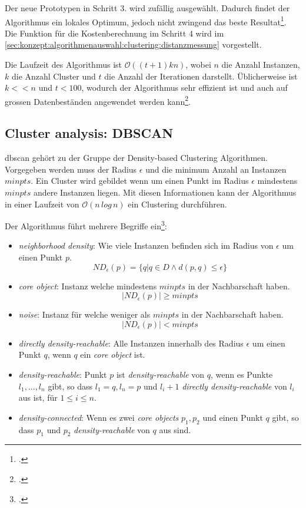Der neue Prototypen in Schritt 3. wird zufällig ausgewählt. Dadurch findet der Algorithmus ein lokales Optimum, jedoch nicht zwingend das beste Resultat\footcite{data_mining_concepts_and_techniques}.
Die Funktion für die Kostenberechnung im Schritt 4 wird im \cref{sec:konzept:algorithmenauswahl:clustering:distanzmessung} vorgestellt.

Die Laufzeit des Algorithmus ist $\mathcal{O}((t+1)kn)$, wobei $n$ die Anzahl Instanzen, $k$ die Anzahl Cluster und $t$ die Anzahl der Iterationen darstellt. Üblicherweise ist $k << n$ und $t < 100$, wodurch der Algorithmus sehr effizient ist und auch auf grossen Datenbeständen angewendet werden kann\footcite{clustering_numeric_and_categorical_values}.

\subsection{Cluster analysis: DBSCAN}
\label{sec:recherche:algorithmen:dbscan}
\gls{dbscan} gehört zu der Gruppe der Density-based Clustering Algorithmen. 
Vorgegeben werden muss der Radius $\epsilon$ und die minimum Anzahl an Instanzen $minpts$. Ein Cluster wird gebildet wenn um einen Punkt im Radius $\epsilon$ mindestens $minpts$ andere Instanzen liegen. Mit diesen Informationen kann der Algorithmus in einer Laufzeit von $\mathcal{O}(n\,log\,n)$ ein Clustering durchführen.

Der Algorithmus führt mehrere Begriffe ein\footcite{data_mining_concepts_and_techniques}:
\begin{itemize}
	\item \textit{neighborhood density}: Wie viele Instanzen befinden sich im Radius von $\epsilon$ um einen Punkt $p$. 
	\begin{equation}
	\mathit{ND}_{\epsilon}(p) = \{q | q \in D \wedge d(p,q) \leq \epsilon\}
	\end{equation}
	\item \textit{core object}: Instanz welche mindestens $minpts$ in der Nachbarschaft haben.
	\begin{equation}
	|\mathit{ND}_{\epsilon}(p)| \geq minpts
	\end{equation}
	\item \textit{noise}: Instanz für welche weniger als $minpts$ in der Nachbarschaft haben.
	\begin{equation}
	|\mathit{ND}_{\epsilon}(p)| < minpts
	\end{equation}
	\item \textit{directly density-reachable}: Alle Instanzen innerhalb des Radius $\epsilon$ um einen Punkt $q$, wenn $q$ ein \textit{core object} ist.
	\item \textit{density-reachable}: Punkt $p$ ist \textit{density-reachable} von $q$, wenn es Punkte $l_1,...,l_n$ gibt, so dass $l_1=q, l_n=p$ und $l_i+1$ \textit{directly density-reachable} von $l_i$ aus ist, für $1 \leq i \leq n$.
	\item \textit{density-connected}: Wenn es zwei \textit{core objects} $p_1,p_2$ und einen Punkt $q$ gibt, so dass $p_1$ und $p_2$ \textit{density-reachable} von $q$ aus sind.
\end{itemize}

